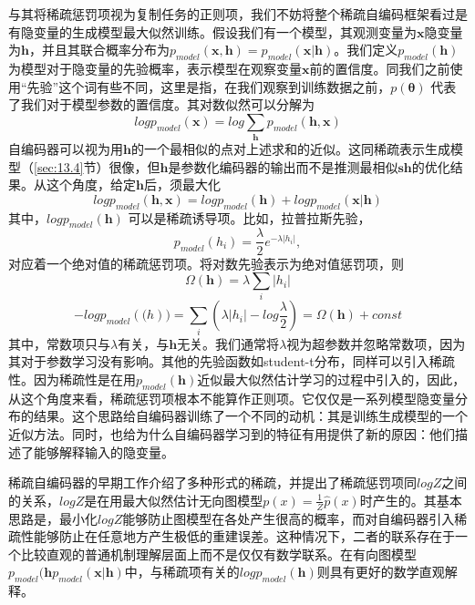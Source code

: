 与其将稀疏惩罚项视为复制任务的正则项，我们不妨将整个稀疏自编码框架看过是有隐变量的生成模型最大似然训练。假设我们有一个模型，其观测变量为$\bm{x}$隐变量为$\bm{h}$，并且其联合概率分布为$p_{model}(\bm{x},\bm{h}) = p_{model}(\bm{x}|\bm{h})$。我们定义$p_{model}(\bm{h})$为模型对于隐变量的先验概率，表示模型在观察变量$\bm{x}$前的置信度。同我们之前使用“先验”这个词有些不同，这里是指，在我们观察到训练数据之前，$p(\bm{\theta})$ 代表了我们对于模型参数的置信度。其对数似然可以分解为
\begin{equation}
	log p_{model}(\bm{x}) = log \sum_{\bm{h}}p_{model}(\bm{h},\bm{x})
\end{equation}
自编码器可以视为用$\bm{h}$的一个最相似的点对上述求和的近似。这同稀疏表示生成模型（\ref{sec:13.4}节）很像，但$\bm{h}$是参数化编码器的输出而不是推测最相似$\bm{sh}$的优化结果。从这个角度，给定$\bm{h}$后，须最大化
\begin{equation}
	log p_{model}(\bm{h},\bm{x}) = log p_{model}(\bm{h}) + log p_{model}(\bm{x}|\bm{h})
\end{equation}
其中，$log p_{model}(\bm{h})$ 可以是稀疏诱导项。比如，拉普拉斯先验，
\begin{equation}
	p_{model}(h_i) = \frac{\lambda}{2}e^{- \lambda |h_i|},
\end{equation}
对应着一个绝对值的稀疏惩罚项。将对数先验表示为绝对值惩罚项，则
\begin{equation}
	\Omega(\bm{h}) = \lambda \sum_i | h_i |
\end{equation}
\begin{equation}
	-log p_{model}(\bm(h)) = \sum_i (\lambda|h_i| - log \frac{\lambda}{2}) = \Omega(\bm{h}) + const
\end{equation}
其中，常数项只与$\lambda$有关，与$\bm{h}$无关。我们通常将$\lambda$视为超参数并忽略常数项，因为其对于参数学习没有影响。其他的先验函数如student-t分布，同样可以引入稀疏性。因为稀疏性是在用$p_{model}(\bm{h})$近似最大似然估计学习的过程中引入的，因此，从这个角度来看，稀疏惩罚项根本不能算作正则项。它仅仅是一系列模型隐变量分布的结果。这个思路给自编码器训练了一个不同的动机：其是训练生成模型的一个近似方法。同时，也给为什么自编码器学习到的特征有用提供了新的原因：他们描述了能够解释输入的隐变量。

稀疏自编码器的早期工作介绍了多种形式的稀疏，并提出了稀疏惩罚项同$log Z$之间的关系，$log Z$是在用最大似然估计无向图模型$p(x) = \frac{1}{Z}\hat{p}(x)$时产生的。其基本思路是，最小化$log Z$能够防止图模型在各处产生很高的概率，而对自编码器引入稀疏性能够防止在任意地方产生极低的重建误差。这种情况下，二者的联系存在于一个比较直观的普通机制理解层面上而不是仅仅有数学联系。在有向图模型$p_{model}(\bm{h}p_{model}(\bm{x}|\bm{h})$中，与稀疏项有关的$log p_{model}(\bm{h})$则具有更好的数学直观解释。

